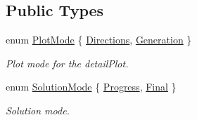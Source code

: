 \subsection*{Public Types}
\begin{DoxyCompactItemize}
\item 
enum \hyperlink{classSGPlotController_a04993344b70e1ac27322f54e43f5bce1}{Plot\+Mode} \{ \hyperlink{classSGPlotController_a04993344b70e1ac27322f54e43f5bce1aaace992b25a6ae65d522747ea10690c7}{Directions}, 
\hyperlink{classSGPlotController_a04993344b70e1ac27322f54e43f5bce1af4b6cf87b680d5b00b0939d0d9744043}{Generation}
 \}\begin{DoxyCompactList}\small\item\em Plot mode for the detail\+Plot. \end{DoxyCompactList}
\item 
enum \hyperlink{classSGPlotController_a7b1cebc57af82edfcbd1d2841ffad95c}{Solution\+Mode} \{ \hyperlink{classSGPlotController_a7b1cebc57af82edfcbd1d2841ffad95cac93156b79a026d54b4b692977da89e87}{Progress}, 
\hyperlink{classSGPlotController_a7b1cebc57af82edfcbd1d2841ffad95ca20f484d13a178c3ac5e886b798efa791}{Final}
 \}\begin{DoxyCompactList}\small\item\em Solution mode. \end{DoxyCompactList}
\end{DoxyCompactItemize}
